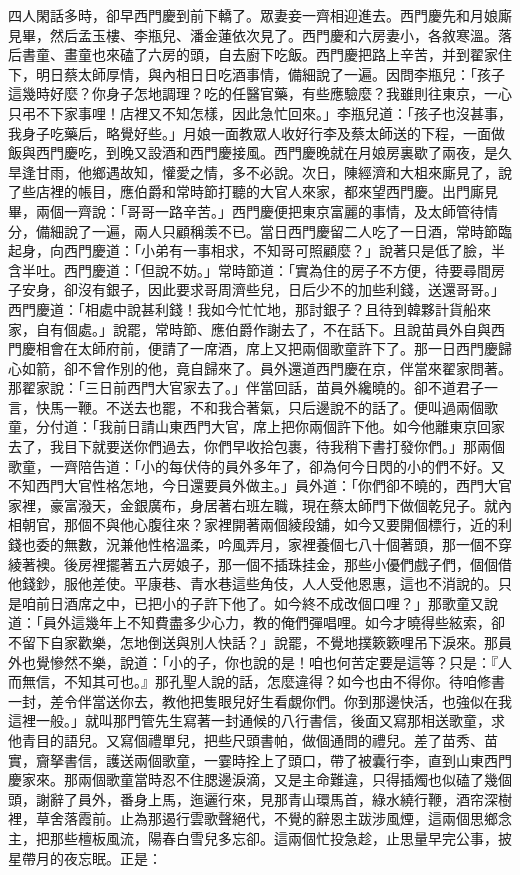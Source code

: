 \begin{showcontents}{}
四人閑話多時，卻早西門慶到前下轎了。眾妻妾一齊相迎進去。西門慶先和月娘廝見畢，然后孟玉樓、李瓶兒、潘金蓮依次見了。西門慶和六房妻小，各敘寒溫。落后書童、畫童也來磕了六房的頭，自去廚下吃飯。西門慶把路上辛苦，并到翟家住下，明日蔡太師厚情，與內相日日吃酒事情，備細說了一遍。因問李瓶兒：「孩子這幾時好麼？你身子怎地調理？吃的任醫官藥，有些應驗麼？我雖則往東京，一心只弔不下家事哩！店裡又不知怎樣，因此急忙回來。」李瓶兒道：「孩子也沒甚事，我身子吃藥后，略覺好些。」月娘一面教眾人收好行李及蔡太師送的下程，一面做飯與西門慶吃，到晚又設酒和西門慶接風。西門慶晚就在月娘房裏歇了兩夜，是久旱逢甘雨，他鄉遇故知，懽愛之情，多不必說。次日，陳經濟和大柤來廝見了，說了些店裡的帳目，應伯爵和常時節打聽的大官人來家，都來望西門慶。出門廝見畢，兩個一齊說：「哥哥一路辛苦。」西門慶便把東京富麗的事情，及太師管待情分，備細說了一遍，兩人只顧稱羡不已。當日西門慶留二人吃了一日酒，常時節臨起身，向西門慶道：「小弟有一事相求，不知哥可照顧麼？」說著只是低了臉，半含半吐。西門慶道：「但說不妨。」常時節道：「實為住的房子不方便，待要尋間房子安身，卻沒有銀子，因此要求哥周濟些兒，日后少不的加些利錢，送還哥哥。」西門慶道：「相處中說甚利錢！我如今忙忙地，那討銀子？且待到韓夥計貨船來家，自有個處。」說罷，常時節、應伯爵作謝去了，不在話下。且說苗員外自與西門慶相會在太師府前，便請了一席酒，席上又把兩個歌童許下了。那一日西門慶歸心如箭，卻不曾作別的他，竟自歸來了。員外還道西門慶在京，伴當來翟家問著。那翟家說：「三日前西門大官家去了。」伴當回話，苗員外纔曉的。卻不道君子一言，快馬一鞭。不送去也罷，不和我合著氣，只后邊說不的話了。便叫過兩個歌童，分付道：「我前日請山東西門大官，席上把你兩個許下他。如今他離東京回家去了，我目下就要送你們過去，你們早收拾包裹，待我稍下書打發你們。」那兩個歌童，一齊陪告道：「小的每伏侍的員外多年了，卻為何今日閃的小的們不好。又不知西門大官性格怎地，今日還要員外做主。」員外道：「你們卻不曉的，西門大官家裡，豪富潑天，金銀廣布，身居著右班左職，現在蔡太師門下做個乾兒子。就內相朝官，那個不與他心腹往來？家裡開著兩個綾段舖，如今又要開個標行，近的利錢也委的無數，況兼他性格溫柔，吟風弄月，家裡養個七八十個著頭，那一個不穿綾著襖。後房裡擺著五六房娘子，那一個不插珠挂金，那些小優們戲子們，個個借他錢鈔，服他差使。平康巷、青水巷這些角伎，人人受他恩惠，這也不消說的。只是咱前日酒席之中，已把小的子許下他了。如今終不成改個口哩？」那歌童又說道：「員外這幾年上不知費盡多少心力，教的俺們彈唱哩。如今才曉得些絃索，卻不留下自家歡樂，怎地倒送與別人快話？」說罷，不覺地撲簌簌哩吊下淚來。那員外也覺慘然不樂，說道：「小的子，你也說的是！咱也何苦定要是這等？只是：『人而無信，不知其可也。』那孔聖人說的話，怎麼違得？如今也由不得你。待咱修書一封，差令伴當送你去，教他把隻眼兒好生看覷你們。你到那邊快活，也強似在我這裡一般。」就叫那門管先生寫著一封通候的八行書信，後面又寫那相送歌童，求他青目的語兒。又寫個禮單兒，把些尺頭書帕，做個通問的禮兒。差了苗秀、苗實，齎拏書信，護送兩個歌童，一霎時拴上了頭口，帶了被囊行李，直到山東西門慶家來。那兩個歌童當時忍不住腮邊淚滴，又是主命難違，只得插燭也似磕了幾個頭，謝辭了員外，番身上馬，迤邐行來，見那青山環馬首，綠水繞行鞭，酒帘深樹裡，草舍落霞前。止為那遏行雲歌聲絕代，不覺的辭恩主跋涉風煙，這兩個思鄉念主，把那些檀板風流，陽春白雪兒多忘卻。這兩個忙投急趁，止思量早完公事，披星帶月的夜忘眠。正是：


\end{showcontents}
